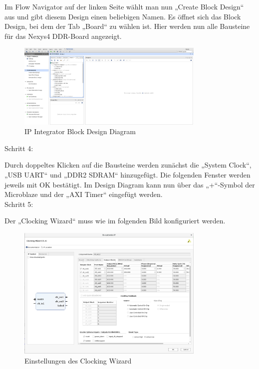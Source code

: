 Im Flow Navigator  auf der linken Seite wählt man nun „Create Block Design“ aus und
 gibt diesem Design einen beliebigen Namen.
Es öffnet sich das Block Design, bei dem der Tab „Board“ zu wählen ist. Hier werden nun
alle Bausteine für das Nexys4 DDR-Board angezeigt.\\

\begin{figure}[H]
\centering
\includegraphics[width=0.8\textwidth]{Hauptteil/schritt3.png}
\caption{IP Integrator Block Design Diagram}\label{fig:mbschritt3}
\end{figure}

Schritt 4:

Durch doppeltes Klicken auf die Bausteine werden zunächst die „System Clock“, „USB UART“ und „DDR2 SDRAM“ hinzugefügt. Die folgenden Fenster werden jeweils mit OK bestätigt.
Im Design Diagram kann nun über das „+“-Symbol der Microblaze und der „AXI Timer“ eingefügt werden.\\


Schritt 5:


Der „Clocking Wizard“ muss wie im folgenden Bild konfiguriert werden.

\begin{figure}[H]
\centering
\includegraphics[width=0.8\textwidth]{Hauptteil/Schritt5.png}
\caption{Einstellungen des Clocking Wizard}\label{fig:mbschritt5}
\end{figure}

